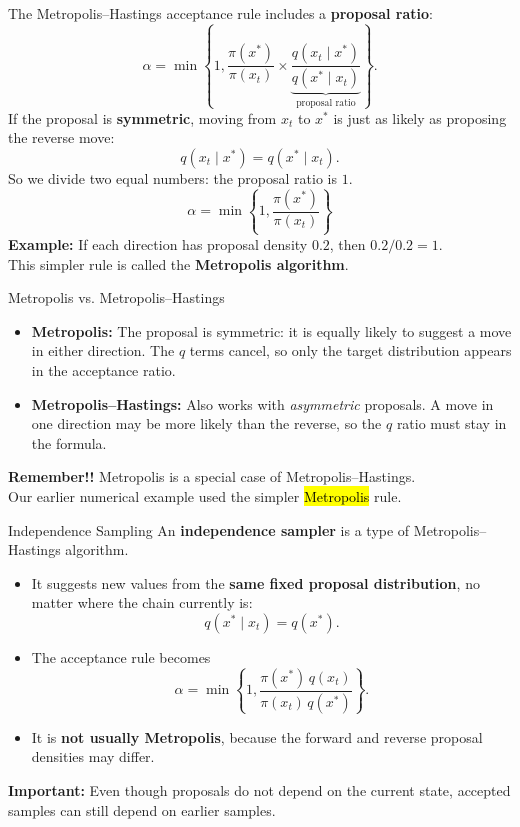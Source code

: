 \documentclass[aspectratio=43,11pt]{beamer}
\begin{document}
\begin{frame}{} %
\small
The Metropolis--Hastings acceptance rule includes a \textbf{proposal ratio}:
\[
\alpha=\min\!\left\{1,\frac{\pi(x^*)}{\pi(x_t)}\times
\underbrace{\frac{q(x_t\mid x^*)}{q(x^*\mid x_t)}}_{\text{proposal ratio}}\right\}.
\]
If the proposal is \textbf{symmetric}, moving from $x_t$ to $x^*$ is just as likely as proposing the reverse move:
\[
q(x_t\mid x^*)=q(x^*\mid x_t).
\]
So we divide two equal numbers: the proposal ratio is $1$.
\[
\boxed{\alpha=\min\!\left\{1,\frac{\pi(x^*)}{\pi(x_t)}\right\}}
\]
\textbf{Example:} If each direction has proposal density $0.2$, then $0.2/0.2=1$.\\[0.1cm]
This simpler rule is called the \textbf{Metropolis algorithm}.
\end{frame}

\begin{frame}{Metropolis vs. Metropolis--Hastings}
\small
\begin{itemize}
\item \textbf{Metropolis:} The proposal is symmetric: it is equally likely to suggest a move in either direction. The $q$ terms cancel, so only the target distribution appears in the acceptance ratio.
\item \textbf{Metropolis--Hastings:} Also works with \emph{asymmetric} proposals. A move in one direction may be more likely than the reverse, so the $q$ ratio must stay in the formula.
\end{itemize}
\vspace{0.3cm}
\textbf{Remember!!} Metropolis is a special case of Metropolis--Hastings.\\[0.25cm]
Our earlier numerical example used the simpler \hl{Metropolis} rule.
\end{frame}

\begin{frame}{Independence Sampling}
\small
An \textbf{independence sampler} is a type of Metropolis--Hastings algorithm.
\begin{itemize}
\item It suggests new values from the \textbf{same fixed proposal distribution}, no matter where the chain currently is:
\[
q(x^*\mid x_t)=q(x^*).
\]
\item The acceptance rule becomes
\[
\alpha=\min\!\left\{1,\frac{\pi(x^*)\,q(x_t)}{\pi(x_t)\,q(x^*)}\right\}.
\]
\item It is \textbf{not usually Metropolis}, because the forward and reverse proposal densities may differ.
\end{itemize}
\vspace{0.1cm}
\textbf{Important:} Even though proposals do not depend on the current state, accepted samples can still depend on earlier samples.
\end{frame}
\end{document}
